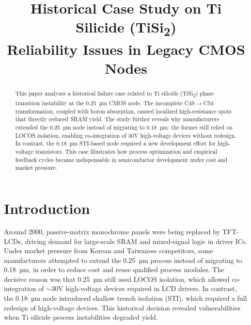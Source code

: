 \documentclass[conference]{IEEEtran}
\begin{document}
\title{Historical Case Study on Ti Silicide (TiSi\textsubscript{2}) \\
Reliability Issues in Legacy CMOS Nodes}

\author{
}

\maketitle

\begin{abstract}
This paper analyzes a historical failure case related to Ti silicide (TiSi\textsubscript{2}) phase transition instability at the 0.25~µm CMOS node. 
The incomplete C49$\rightarrow$C54 transformation, coupled with boron absorption, caused localized high-resistance spots that directly reduced SRAM yield. 
The study further reveals why manufacturers extended the 0.25~µm node instead of migrating to 0.18~µm: the former still relied on LOCOS isolation, enabling co-integration of 30V high-voltage devices without redesign. 
In contrast, the 0.18~µm STI-based node required a new development effort for high-voltage transistors. 
This case illustrates how process optimization and empirical feedback cycles became indispensable in semiconductor development under cost and market pressure.
\end{abstract}

\section{Introduction}
Around 2000, passive-matrix monochrome panels were being replaced by TFT-LCDs, driving demand for large-scale SRAM and mixed-signal logic in driver ICs. 
Under market pressure from Korean and Taiwanese competitors, some manufacturers attempted to extend the 0.25~µm process instead of migrating to 0.18~µm, in order to reduce cost and reuse qualified process modules. 
The decisive reason was that 0.25~µm still used LOCOS isolation, which allowed co-integration of $\sim$30V high-voltage devices required in LCD drivers. 
In contrast, the 0.18~µm node introduced shallow trench isolation (STI), which required a full redesign of high-voltage devices. 
This historical decision revealed vulnerabilities when Ti silicide process instabilities degraded yield.
\end{document}
